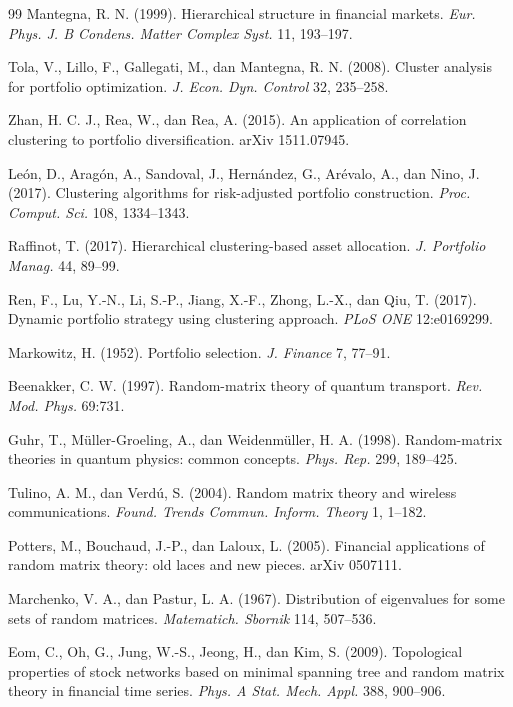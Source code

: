 \documentclass[12pt,a4paper]{article}
\begin{document}
\begin{thebibliography}{99}
 Mantegna, R. N. (1999). Hierarchical structure in financial markets. \textit{Eur. Phys. J. B Condens. Matter Complex Syst.} 11, 193–197.

 Tola, V., Lillo, F., Gallegati, M., dan Mantegna, R. N. (2008). Cluster analysis for portfolio optimization. \textit{J. Econ. Dyn. Control} 32, 235–258.

 Zhan, H. C. J., Rea, W., dan Rea, A. (2015). An application of correlation clustering to portfolio diversification. arXiv 1511.07945.

 León, D., Aragón, A., Sandoval, J., Hernández, G., Arévalo, A., dan Nino, J. (2017). Clustering algorithms for risk-adjusted portfolio construction. \textit{Proc. Comput. Sci.} 108, 1334–1343.

 Raffinot, T. (2017). Hierarchical clustering-based asset allocation. \textit{J. Portfolio Manag.} 44, 89–99.

 Ren, F., Lu, Y.-N., Li, S.-P., Jiang, X.-F., Zhong, L.-X., dan Qiu, T. (2017). Dynamic portfolio strategy using clustering approach. \textit{PLoS ONE} 12:e0169299.

 Markowitz, H. (1952). Portfolio selection. \textit{J. Finance} 7, 77–91.

 Beenakker, C. W. (1997). Random-matrix theory of quantum transport. \textit{Rev. Mod. Phys.} 69:731.

 Guhr, T., Müller-Groeling, A., dan Weidenmüller, H. A. (1998). Random-matrix theories in quantum physics: common concepts. \textit{Phys. Rep.} 299, 189–425.

 Tulino, A. M., dan Verdú, S. (2004). Random matrix theory and wireless communications. \textit{Found. Trends Commun. Inform. Theory} 1, 1–182.

 Potters, M., Bouchaud, J.-P., dan Laloux, L. (2005). Financial applications of random matrix theory: old laces and new pieces. arXiv 0507111.

 Marchenko, V. A., dan Pastur, L. A. (1967). Distribution of eigenvalues for some sets of random matrices. \textit{Matematich. Sbornik} 114, 507–536.

 Eom, C., Oh, G., Jung, W.-S., Jeong, H., dan Kim, S. (2009). Topological properties of stock networks based on minimal spanning tree and random matrix theory in financial time series. \textit{Phys. A Stat. Mech. Appl.} 388, 900–906.


\end{thebibliography}
\end{document}
